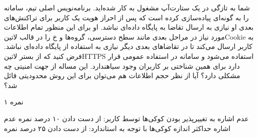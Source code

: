 \documentclass[../main.tex]{subfiles}
\begin{document}

شما به تازگی در یک ستارت‌آپ مشغول به کار شده‌اید.
برنامه‌نویس اصلی تیم، سامانه را به گونه‌ای پیاده‌سازی کرده است که پس از احراز هویت یک کاربر
برای تراکنش‌های بعدی او نیازی به ارسال تقاضا به پایگاه داده‌ای نباشد.
او برای این منظور تمام اطلاعات مورد نیاز در مراحل بعدی مانند سطح دسترسی، گروه‌ها و ‌خ را در قالب ‌لاتین{Cookie}
به کاربر ارسال می‌کند تا در تقاضاهای بعدی دیگر نیازی به استفاده از پایگاه داده‌ای نباشد.
فرض کنید که از بستر ‌لاتین{HTTPS} استفاده می‌شود و سامانه در استفاده عمومی قرار دارد برای همین شناختی بر کاربران وجود ‌سیاه{ندارد}.
این مساله از جهت امنیتی چه مشکلی دارد؟
آیا از نظر حجم اطلاعات هم می‌توان برای این روش محدودیتی قائل شد؟

۱ نمره

 عدم اشاره به تغییرپذیر بودن کوکی‌ها توسط کاربر: از دست دادن ۱۰ درصد نمره
 عدم اشاره حداکثر اندازه کوکی‌ها با توجه به استاندارد: از دست دادن ۲۵ درصد نمره
\end{document}
